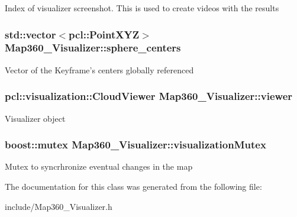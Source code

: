 Index of visualizer screenshot. This is used to create videos with the results \hypertarget{classMap360__Visualizer_a788f1a552e4511c3c2169e42a0d2296e}{
\subsubsection[{sphere\-\_\-centers}]{\setlength{\rightskip}{0pt plus 5cm}std\-::vector$<$pcl\-::\-Point\-X\-Y\-Z$>$ Map360\-\_\-\-Visualizer\-::sphere\-\_\-centers}}\label{classMap360__Visualizer_a788f1a552e4511c3c2169e42a0d2296e}
Vector of the Keyframe's centers globally referenced \hypertarget{classMap360__Visualizer_ad9217d08c210272984708a05d44fd2c0}{
\subsubsection[{viewer}]{\setlength{\rightskip}{0pt plus 5cm}pcl\-::visualization\-::\-Cloud\-Viewer Map360\-\_\-\-Visualizer\-::viewer}}\label{classMap360__Visualizer_ad9217d08c210272984708a05d44fd2c0}
Visualizer object \hypertarget{classMap360__Visualizer_ae0a693e05320051180b367b0d300b328}{
\subsubsection[{visualization\-Mutex}]{\setlength{\rightskip}{0pt plus 5cm}boost\-::mutex Map360\-\_\-\-Visualizer\-::visualization\-Mutex}}\label{classMap360__Visualizer_ae0a693e05320051180b367b0d300b328}
Mutex to syncrhronize eventual changes in the map 

The documentation for this class was generated from the following file\-:\begin{DoxyCompactItemize}
\item 
include/Map360\-\_\-\-Visualizer.\-h\end{DoxyCompactItemize}
